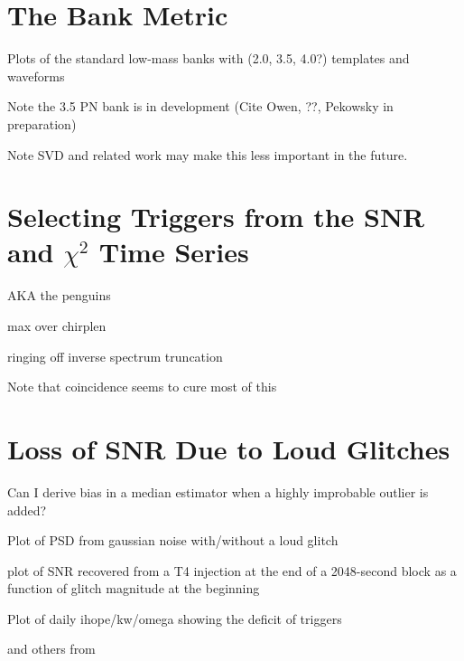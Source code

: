 \section{The Bank Metric}

Plots of the standard low-mass banks with (2.0, 3.5, 4.0?) templates
and waveforms

Note the 3.5 PN bank is in development (Cite Owen, ??, Pekowsky in
preparation)

Note SVD and related work may make this less important in the future.


\section{Selecting Triggers from the SNR and $\chi^2$ Time Series}

AKA the penguins

max over chirplen

ringing off inverse spectrum truncation

Note that coincidence seems to cure most of this


\section{Loss of SNR Due to Loud Glitches}

Can I derive bias in a median estimator when a highly improbable
outlier is added?

Plot of PSD from gaussian noise with/without a loud glitch

plot of SNR recovered from a T4 injection at the end of a 2048-second
block as a function of glitch magnitude at the beginning

Plot of daily ihope/kw/omega showing the deficit of triggers



and others from


